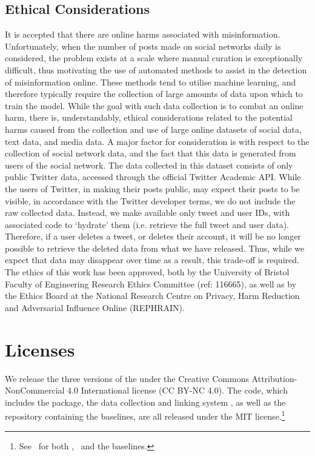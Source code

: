 \documentclass[sigconf,natbib=true,anonymous=false,nonacm]{acmart}
\begin{document}
\subsection{Ethical Considerations}
\label{sec:ethicalconsiderations}
It is accepted that there are online harms associated with misinformation.
Unfortunately, when the number of posts made on social networks daily is
considered, the problem exists at a scale where manual curation is
exceptionally difficult, thus motivating the use of automated methods to assist
in the detection of misinformation online. These methods tend to utilise
machine learning, and therefore typically require the collection of large
amounts of data upon which to train the model. While the goal with such data
collection is to combat an online harm, there is, understandably, ethical
considerations related to the potential harms caused from the collection and
use of large online datasets of social data, text data, and media data. A major
factor for consideration is with respect to the collection of social network
data, and the fact that this data is generated from users of the social
network. The data collected in this dataset consists of only public Twitter
data, accessed through the official Twitter Academic API. While the users of
Twitter, in making their posts public, may expect their posts to be visible, in
accordance with the Twitter developer terms, we do not include the raw
collected data. Instead, we make available only tweet and user IDs, with
associated code to `hydrate’ them (i.e. retrieve the full tweet and user data).
Therefore, if a user deletes a tweet, or deletes their account, it will be no
longer possible to retrieve the deleted data from what we have released. Thus,
while we expect that data may disappear over time as a result, this trade-off
is required. The ethics of this work has been approved, both by the University
of Bristol Faculty of Engineering Research Ethics Committee (ref: 116665), as
well as by the Ethics Board at the National Research Centre on Privacy, Harm
Reduction and Adversarial Influence Online (REPHRAIN).


\section{Licenses}
\label{sec:licenses}
We release the three versions of the \datasetname under the Creative Commons
Attribution-NonCommercial 4.0 International license (CC BY-NC 4.0). The code,
which includes the \pkgname package, the data collection and linking system
\trawlname, as well as the repository containing the baselines, are all
released under the MIT license.\footnote{See \dataseturl\ for both \pkgname,
\trawlname\ and the baselines.}
\end{document}
